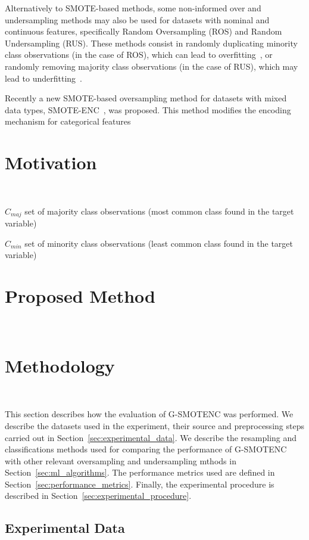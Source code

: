 \documentclass[parskip=full]{scrartcl}
\begin{document}
Alternatively to SMOTE-based methods, some non-informed over and undersampling
methods may also be used for datasets with nominal and continuous features,
specifically Random Oversampling (ROS) and Random Undersampling (RUS). These
methods consist in randomly duplicating minority class observations (in the
case of ROS), which can lead to overfitting~\cite{park2021combined,
batista2004study}, or randomly removing majority class observations (in the
case of RUS), which may lead to underfitting~\cite{bansal2021analysis}.

Recently a new SMOTE-based oversampling method for datasets with mixed data
types, SMOTE-ENC~\cite{mukherjee2021smote}, was proposed. This method modifies
the encoding mechanism for categorical features

\section{Motivation}~\label{sec:motivation}

$C_{maj}$ set of majority class observations (most common class found in the
target variable)

$C_{min}$ set of minority class observations (least common class found in the
target variable)


\section{Proposed Method}~\label{sec:proposed_method}

\section{Methodology}~\label{sec:methodology}

This section describes how the evaluation of G-SMOTENC was performed.  We
describe the datasets used in the experiment, their source and preprocessing
steps carried out in Section~\ref{sec:experimental_data}. We describe the
resampling and classifications methods used for comparing the performance of
G-SMOTENC with other relevant oversampling and undersampling mthods in
Section~\ref{sec:ml_algorithms}. The performance metrics used are defined in
Section~\ref{sec:performance_metrics}. Finally, the experimental procedure is
described in Section~\ref{sec:experimental_procedure}.

\subsection{Experimental Data}~\label{sec:experimental_data}
\end{document}
